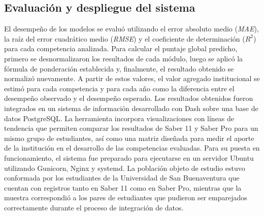 \subsection{Evaluación y despliegue del sistema}
El desempeño de los modelos se evaluó utilizando el error absoluto medio (\textit{MAE}), la raíz del error cuadrático medio (\textit{RMSE}) y el coeficiente de determinación ($R^2$) para cada competencia analizada. Para calcular el puntaje global predicho, primero se desnormalizaron los resultados de cada módulo, luego se aplicó la fórmula de ponderación establecida y, finalmente, el resultado obtenido se normalizó nuevamente. A partir de estos valores, el valor agregado institucional se estimó para cada competencia y para cada año como la diferencia entre el desempeño observado y el desempeño esperado. Los resultados obtenidos fueron integrados en un sistema de información desarrollado con Dash sobre una base de datos PostgreSQL. La herramienta incorpora visualizaciones con líneas de tendencia que permiten comparar los resultados de Saber 11 y Saber Pro para un mismo grupo de estudiantes, así como una matriz diseñada para medir el aporte de la institución en el desarrollo de las competencias evaluadas. Para su puesta en funcionamiento, el sistema fue preparado para ejecutarse en un servidor Ubuntu utilizando Gunicorn, Nginx y systemd. La población objeto de estudio estuvo conformada por los estudiantes de la Universidad de San Buenaventura que cuentan con registros tanto en Saber 11 como en Saber Pro, mientras que la muestra correspondió a los pares de estudiantes que pudieron ser emparejados correctamente durante el proceso de integración de datos.